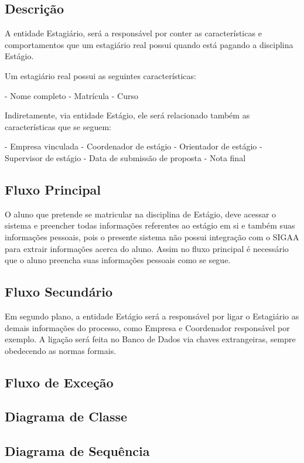 \subsection{Descrição}
A entidade Estagiário, será a responsável por conter as características e comportamentos que um estagiário real possui quando está pagando a disciplina Estágio.

Um estagiário real possui as seguintes características:

- Nome completo
- Matrícula
- Curso

Indiretamente, via entidade Estágio, ele será relacionado também as características que se seguem:

- Empresa vinculada
- Coordenador de estágio
- Orientador de estágio
- Supervisor de estágio
- Data de submissão de proposta
- Nota final


\subsection{Fluxo Principal}
O aluno que pretende se matricular na disciplina de Estágio, deve acessar o sistema e preencher todas informações referentes ao estágio em si e também suas informações pessoais, pois o
presente sistema não possui integração com o SIGAA para extrair informações acerca do aluno. Assim no fluxo principal é necessário que o aluno preencha suas informações pessoais como se segue.



\subsection{Fluxo Secundário}
Em segundo plano, a entidade Estágio será a responsável por ligar o Estagiário as demais informações do processo, como Empresa e Coordenador responsável por exemplo.
A ligação será feita no Banco de Dados via chaves extrangeiras, sempre obedecendo as normas formais.


\subsection{Fluxo de Exceção}

\subsection{Diagrama de Classe}

\subsection{Diagrama de Sequência}